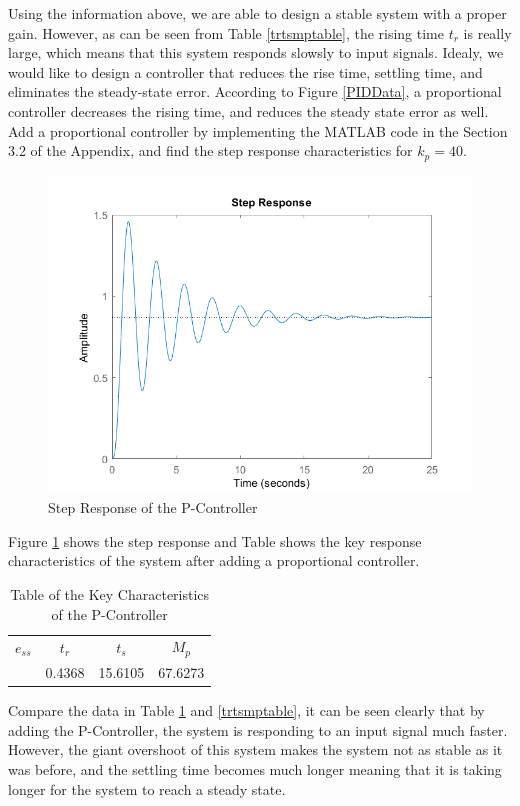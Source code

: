 \documentclass[a4paper, twocolumn, titlepage, 10pt]{article}
\begin{document}
		Using the information above, we are able to design a stable system with a proper gain. However, as can be seen from Table \ref{trtsmptable}, the rising time $t_r$ is really large, which means that this system responds slowsly to input signals. Idealy, we would like to design a controller that reduces the rise time, settling time, and eliminates the steady-state error. According to Figure \ref{PIDData}, a proportional controller decreases the rising time, and reduces the steady state error as well. Add a proportional controller by implementing the MATLAB code in the Section 3.2 of the Appendix, and find the step response characteristics for $k_p = 40$.
		\begin{figure}[H]
			\centering
			\includegraphics[width=\linewidth]{StepPC}
			\caption{Step Response of the P-Controller}
			\label{steppc}
		\end{figure}
		
		Figure \ref{steppc} shows the step response and Table shows the key response characteristics of the system after adding a proportional controller. 
		\begin{table}[H]
			\centering
			\begin{tabular}{c c c c}
				$e_{ss}$ & $t_r$ & $t_s$ & $M_p$ \\
				& 0.4368 & 15.6105 & 67.6273
			\end{tabular}
			\caption{Table of the Key Characteristics of the P-Controller}
			\label{responseCharPC}
		\end{table}
		
		Compare the data in Table \ref{responseCharPC} and \ref{trtsmptable}, it can be seen clearly that by adding the P-Controller, the system is responding to an input signal much faster. However, the giant overshoot of this system makes the system not as stable as it was before, and the settling time becomes much longer meaning that it is taking longer for the system to reach a steady state.
	
\end{document}
